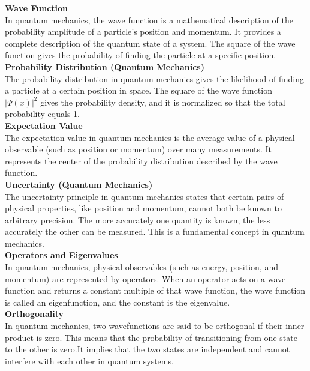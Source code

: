 \documentclass[a4paper,12pt]{article}
\begin{document}
\begin{footnotesize}
\begin{multicols}{3}
\textbf{Wave Function} \\
In quantum mechanics, the wave function is a mathematical description of the probability amplitude of a particle's position and momentum. It provides a complete description of the quantum state of a system. The square of the wave function gives the probability of finding the particle at a specific position. \\

\textbf{Probability Distribution (Quantum Mechanics)} \\
The probability distribution in quantum mechanics gives the likelihood of finding a particle at a certain position in space. The square of the wave function \( |\Psi(x)|^2 \) gives the probability density, and it is normalized so that the total probability equals 1. \\

\textbf{Expectation Value} \\
The expectation value in quantum mechanics is the average value of a physical observable (such as position or momentum) over many measurements. It represents the center of the probability distribution described by the wave function. \\

\textbf{Uncertainty (Quantum Mechanics)} \\
The uncertainty principle in quantum mechanics states that certain pairs of physical properties, like position and momentum, cannot both be known to arbitrary precision. The more accurately one quantity is known, the less accurately the other can be measured. This is a fundamental concept in quantum mechanics. \\

\textbf{Operators and Eigenvalues} \\
In quantum mechanics, physical observables (such as energy, position, and momentum) are represented by operators. When an operator acts on a wave function and returns a constant multiple of that wave function, the wave function is called an eigenfunction, and the constant is the eigenvalue. \\

\textbf{Orthogonality} \\
In quantum mechanics, two wavefunctions are said to be orthogonal if their inner product is zero. This means that the probability of transitioning from one state to the other is zero.It implies that the two states are independent and cannot interfere with each other in quantum systems.


\end{multicols}
\end{footnotesize}
\end{document}
